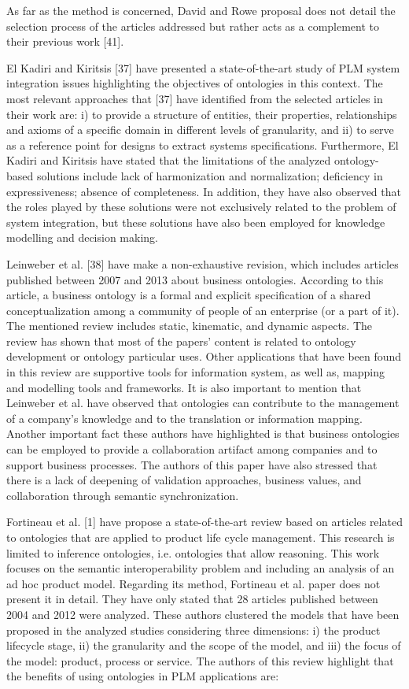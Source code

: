 \documentclass[peerreview]{IEEEtran}
\begin{document}
As far as the method is concerned, David and Rowe proposal does not detail the selection process of the articles addressed but rather acts as a complement to their previous work [41].


El Kadiri and Kiritsis [37] have presented a state-of-the-art study of PLM system integration issues highlighting the objectives of ontologies in this context. The most relevant approaches that [37] have identified from the selected articles in their work are: i) to provide a structure of entities, their properties, relationships and axioms of a specific domain in different levels of granularity, and ii) to serve as a reference point for designs to extract systems specifications. Furthermore, El Kadiri and Kiritsis have stated that the limitations of the analyzed ontology-based solutions include lack of harmonization and normalization; deficiency in expressiveness; absence of completeness. In addition, they have also observed that the roles played by these solutions were not exclusively related to the problem of system integration, but these solutions have also been employed for knowledge modelling and decision making.


Leinweber et al. [38] have make a non-exhaustive revision, which includes articles published between 2007 and 2013 about business ontologies. According to this article, a business ontology is a formal and explicit specification of a shared conceptualization among a community of people of an enterprise (or a part of it). The mentioned review includes static, kinematic, and dynamic aspects. The review has shown that most of the papers’ content is related to ontology development or ontology particular uses. Other applications that have been found in this review are supportive tools for information system, as well as, mapping and modelling tools and frameworks. It is also important to mention that Leinweber et al. have observed that ontologies can contribute to the management of a company’s knowledge and to the translation or information mapping. Another important fact these authors have highlighted is that business ontologies can be employed to provide a collaboration artifact among companies and to support business processes. The authors of this paper have also stressed that there is a lack of deepening of validation approaches, business values, and collaboration through semantic synchronization.


Fortineau et al. [1] have propose a state-of-the-art review based on articles related to ontologies that are applied to product life cycle management. This research is limited to inference ontologies, i.e. ontologies that allow reasoning. This work focuses on the semantic interoperability problem and including an analysis of an ad hoc product model. Regarding its method, Fortineau et al. paper does not present it in detail. They have only stated that 28 articles published between 2004 and 2012 were analyzed. These authors clustered the models that have been proposed in the analyzed studies considering three dimensions: i) the product lifecycle stage, ii) the granularity and the scope of the model, and iii) the focus of the model: product, process or service. The authors of this review highlight that the benefits of using ontologies in PLM applications are:
\end{document}
